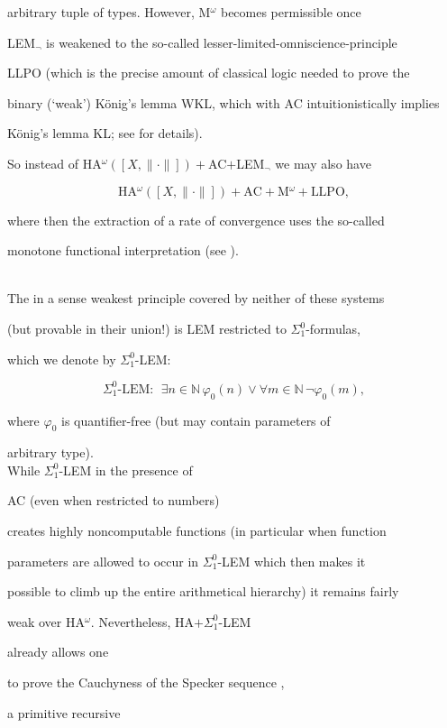 \documentclass[1p]{elsarticle}
\newcommand{\NN}{\ensuremath{\mathbb{N}}}
\theoremstyle{plain}
\theoremstyle{definition}
\theoremstyle{remark}
\theoremstyle{definition}
\begin{document}
arbitrary tuple of types. However, M$^{\omega}$ becomes permissible once 

LEM$_{\neg}$ is weakened to the so-called lesser-limited-omniscience-principle 

LLPO (which is the precise amount of classical logic needed to prove the 

binary (`weak') K\"onig's lemma WKL, which with AC intuitionistically implies 

K\"onig's lemma KL; see \cite{Kohlenbach(book)} for details).

So instead of HA$^{\omega}([X,\|\cdot\|])+$AC$+$LEM$_{\neg}$ we may also have 

\[ \mbox{HA$^{\omega}([X,\|\cdot \| ])+$AC$+$M$^{\omega}+$LLPO}, \] 

where then the extraction of a rate of convergence uses the so-called 

monotone functional interpretation (see \cite{Kohlenbach(book)}).

\\[2mm] The in a sense weakest principle covered by neither of these systems 

(but provable in their union!) is LEM restricted to $\Sigma^0_1$-formulas, 

which we denote by $\Sigma^0_1$-LEM: 

\[ \Sigma^0_1\mbox{-LEM}: \ \ \exists n\in\NN \,\varphi_0(n)\vee

\forall m\in\NN\,\neg \varphi_0(m), \]

where $\varphi_0$ is quantifier-free (but may contain parameters of 

arbitrary type). \\  

While $\Sigma^0_1$-LEM in the presence of 

AC (even when restricted to numbers) 

creates highly noncomputable functions (in particular when function 

parameters are allowed to occur in $\Sigma^0_1$-LEM which then makes it 

possible to climb up the entire arithmetical hierarchy) it remains fairly 

weak over HA$^{\omega}.$ Nevertheless, HA$+\Sigma^0_1$-LEM 

already allows one

to prove the Cauchyness of the Specker sequence \cite{Specker(49)}, 

a primitive recursive 
\end{document}
